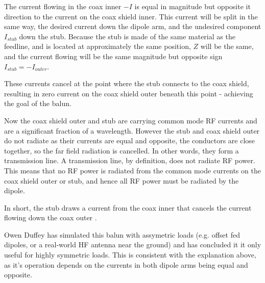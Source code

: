 \documentclass{article}
\begin{document}
The current flowing in the coax inner $-I$ is equal in magnitude but opposite it direction to the current on the coax shield inner.  This current will be split in the same way, the desired current down the dipole arm, and the undesired component $I_{stub}$ down the stub.  Because the stub is made of the same material as the feedline, and is located at approximately the same position, $Z$ will be the same, and the current flowing will be the same magnitude but opposite sign $I_{stub}=-I_{outer}$.  

These currents cancel at the point where the stub connects to the coax shield, resulting in zero current on the coax shield outer beneath this point - achieving the goal of the balun.

Now the coax shield outer and stub are carrying common mode RF currents and are a significant fraction of a wavelength. However the stub and coax shield outer do not radiate as their currents are equal and opposite, the conductors are close together, so the far field radiation is cancelled.  In other words, they form a transmission line.  A transmission line, by definition, does not radiate RF power. This means that no RF power is radiated from the common mode currents on the coax shield outer or stub, and hence all RF power must be radiated by the dipole.

In short, the stub draws a current from the coax inner that cancels the current flowing down the coax outer \cite{antenna_theory}.

Owen Duffey \cite{duffey} has simulated this balun with assymetric loads (e.g. offset fed dipoles, or a real-world HF antenna near the ground) and has concluded it it only useful for highly symmetric loads.  This is consistent with the explanation above, as it's operation depends on the currents in both dipole arms being equal and opposite.



\end{document}
